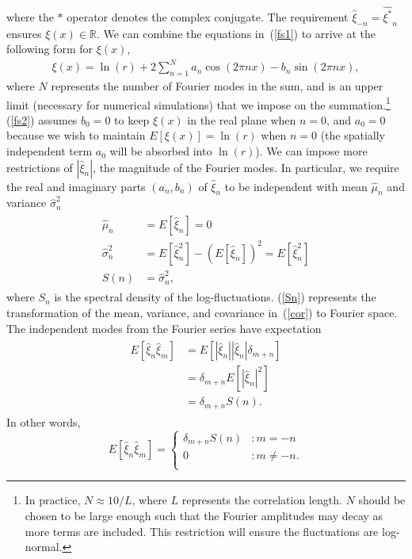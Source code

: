 where the $*$ operator denotes the complex
conjugate. The requirement $\hat{\xi}_{-n}=\hat{\xi^*}_{n}$ ensures
$\xi(x) \in \mathbb{R}$. We can combine
the equations in~(\ref{fs1}) to arrive at the following form for
$\xi(x)$,
\begin{align}\label{fs2}
\xi(x) = \ln(r) + 2\sum^N_{n=1}a_n\cos(2\pi nx)-b_n\sin(2\pi nx),
\end{align}
where $N$ represents the number of Fourier modes in the sum, and is an
upper limit (necessary for numerical
simulations) that we impose on the summation.\footnote{In practice, $N
  \approx 10/L$, where $L$ represents the correlation length. $N$
  should be chosen to be large enough such that the Fourier amplitudes
may decay as more terms are included. This restriction will ensure the
fluctuations are log-normal.} (\ref{fs2}) assumes
$b_0=0$ to keep $\xi(x)$ in the real plane when $n=0$, and $a_0=0$
because we wish to maintain $E[\xi(x)]=\ln(r)$ when $n=0$ (the
spatially independent term $a_0$ will be absorbed into $\ln(r)$).
We can impose more restrictions of $|\hat{\xi}_n|$, the magnitude of
the Fourier modes. In particular,
we require the real and imaginary parts $(a_n,b_n)$ of $\hat{\xi}_n$
to be independent with mean $\hat{\mu}_n$ and variance $\hat{\sigma}^2_n$
\begin{align}
\begin{split}\label{Sn}
\hat{\mu}_n&=E[\hat{\xi}_n]=0\\
\hat{\sigma}_n^2&=E[\hat{\xi}_n^2]-(E[\hat{\xi}_n])^2=E[\hat{\xi}_n^2]\\
S(n)&=\hat{\sigma}_n^2,
\end{split}
\end{align}
where $S_n$ is the spectral density of the
log-fluctuations. (\ref{Sn}) represents the transformation of the
mean, variance, and covariance in~(\ref{cor}) to Fourier space. The
independent modes from the Fourier series have expectation
\begin{align*}
\begin{split}
E[\hat{\xi}_n\hat{\xi}_m]&=E[|\hat{\xi}_n||\hat{\xi}_n|\delta_{m+n}]\\
&=\delta_{m+n}E[|\hat{\xi}_n|^2]\\
&=\delta_{m+n}S(n).
\end{split}
\end{align*}
In other words, 
\begin{displaymath}
   E[\hat{\xi}_n\hat{\xi}_m] = \left\{
     \begin{array}{lr}
       \delta_{m+n}S(n) & : m = -n\\
       0 & : m \neq -n.\\
     \end{array}
   \right.
\end{displaymath} 
